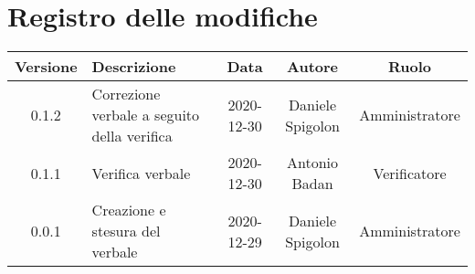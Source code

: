 \section*{Registro delle modifiche}

\begin{center}
	\begin{longtable}{|c|p{5cm}|c|c|c|}
	\hline
	\rowcolor{lighter-grayer}
	\textbf{Versione} & \textbf{Descrizione} & \textbf{Data} & \textbf{Autore} & \textbf{Ruolo} \\
	\hline
	\endfirsthead

	0.1.2 & Correzione verbale a seguito della verifica & 2020-12-30 & Daniele Spigolon & Amministratore \\
	\hline
	0.1.1 & Verifica verbale & 2020-12-30 & Antonio Badan & Verificatore \\
	\hline
	0.0.1 & Creazione e stesura del verbale & 2020-12-29 & Daniele Spigolon & Amministratore \\
	\hline
	\end{longtable}
\end{center}